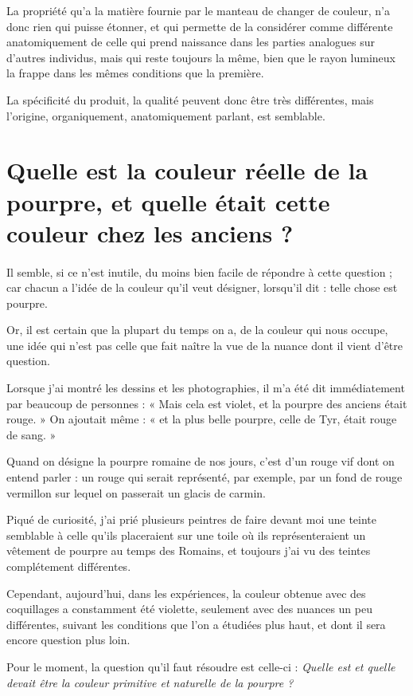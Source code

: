 \documentclass[a4paper, 11pt, oneside, polutonikogreek, french]{article}
\begin{document}
La propriété qu'a la matière fournie par le manteau de changer de couleur, n'a donc rien qui puisse étonner, et qui permette de la considérer comme différente anatomiquement de celle qui prend naissance dans les parties analogues sur d'autres individus, mais qui reste toujours la même, bien que le rayon lumineux la frappe dans les mêmes conditions que la première.

La spécificité du produit, la qualité peuvent donc être très différentes, mais l'origine, organiquement, anatomiquement parlant, est semblable.
\clearpage
\section{Quelle est la couleur réelle de la pourpre, et quelle était cette couleur chez les anciens ?}
\paragraph{}
Il semble, si ce n'est inutile, du moins bien facile de répondre à cette question ; car chacun a l'idée de la couleur qu'il veut désigner, lorsqu'il dit : telle chose est pourpre.

Or, il est certain que la plupart du temps on a, de la couleur qui nous occupe, une idée qui n'est pas celle que fait naître la vue de la nuance dont il vient d'être question.

Lorsque j'ai montré les dessins et les photographies, il m'a été dit immédiatement par beaucoup de personnes : « Mais cela est violet, et la pourpre des anciens était rouge. » On ajoutait même : « et la plus belle pourpre, celle de Tyr, était rouge de sang. »

Quand on désigne la pourpre romaine de nos jours, c'est d'un rouge vif dont on entend parler : un rouge qui serait représenté, par exemple, par un fond de rouge vermillon sur lequel on passerait un glacis de carmin.

Piqué de curiosité, j'ai prié plusieurs peintres de faire devant moi une teinte semblable à celle qu'ils placeraient sur une toile où ils représenteraient un vêtement de pourpre au temps des Romains, et toujours j'ai vu des teintes complétement différentes.

Cependant, aujourd'hui, dans les expériences, la couleur obtenue avec des coquillages a constamment été violette, seulement avec des nuances un peu différentes, suivant les conditions que l'on a étudiées plus haut, et dont il sera encore question plus loin.

Pour le moment, la question qu'il faut résoudre est celle-ci : \emph{Quelle est et quelle devait être la couleur primitive et naturelle de la pourpre ?}
\end{document}
